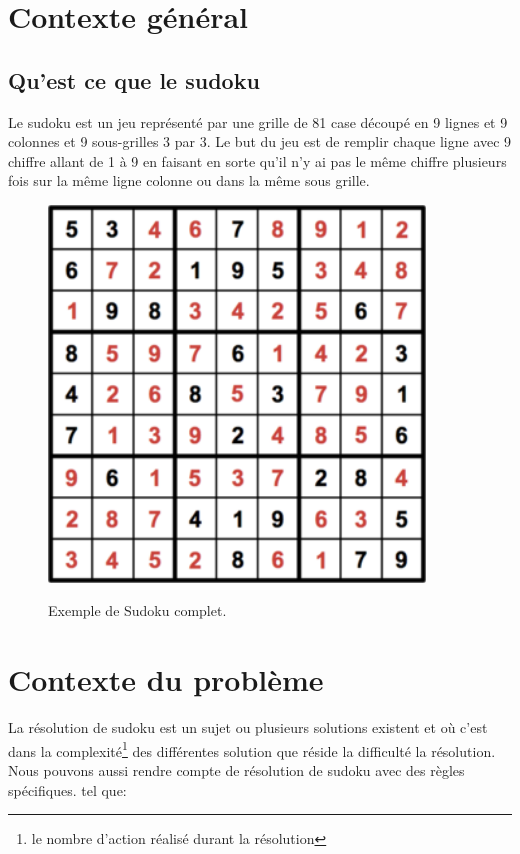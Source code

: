 
\hypertarget{contexte-general}{%
\section{Contexte général}\label{contexte-guxe9nuxe9ral}}
\subsection{Qu'est ce que le sudoku}

Le sudoku est un jeu représenté par une grille de 81 case découpé en 9 lignes et 9 colonnes et 9 sous-grilles 3 par 3.
Le but du jeu est de remplir chaque ligne avec 9 chiffre allant de 1 à 9 en faisant en sorte qu'il n'y ai pas le même chiffre plusieurs fois sur la même ligne colonne ou dans la même sous grille.

\begin{figure}[!h]
\centering
\includegraphics[width=10cm]{./images/Sudoku_Exemple.png}\label{Sudoku}
\caption{Exemple de Sudoku complet.}
\end{figure}

\hypertarget{Contexte du problème}{%
\section{Contexte du problème}\label{Contexte_du_probleme}}

La résolution de sudoku est un sujet ou plusieurs solutions existent et où c'est dans la complexité\footnote{le nombre d'action réalisé durant la résolution} des différentes solution que réside la difficulté la résolution. Nous pouvons aussi rendre compte de résolution de sudoku avec des règles spécifiques.
tel que:

